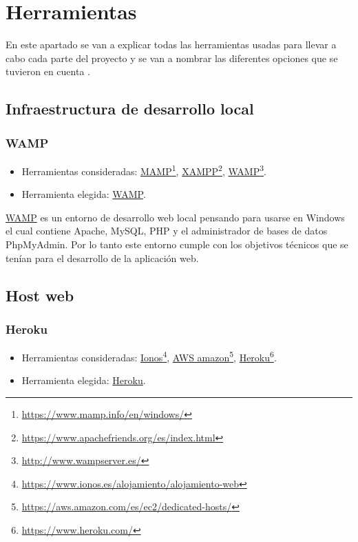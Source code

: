 \section{Herramientas} 

En este apartado se van a explicar todas las herramientas usadas para llevar a cabo cada parte del proyecto y se van a nombrar las diferentes opciones que se tuvieron en cuenta .

\subsection{Infraestructura de desarrollo local}

\subsubsection{WAMP} \label{WAMP}
\begin{itemize}
    \item Herramientas consideradas: \href{https://www.mamp.info/en/windows/}{MAMP}\footnote{\href{https://www.mamp.info/en/windows/}{https://www.mamp.info/en/windows/}}, \href{https://www.apachefriends.org/es/index.html}{XAMPP}\footnote{\href{https://www.apachefriends.org/es/index.html}{https://www.apachefriends.org/es/index.html}}, \href{http://www.wampserver.es/}{WAMP}\footnote{\label{wampfoot}\href{http://www.wampserver.es/}{http://www.wampserver.es/}}.
	\item Herramienta elegida: \href{http://www.wampserver.es/}{WAMP}.
\end{itemize}

\href{http://www.wampserver.es/}{WAMP} es un entorno de desarrollo web local pensando para usarse en Windows el cual contiene Apache, MySQL, PHP y el administrador de bases de datos PhpMyAdmin. Por lo tanto este entorno cumple con los objetivos técnicos que se tenían para el desarrollo de la aplicación web.

\subsection{Host web}

\subsubsection{Heroku} \label{Heroku}
\begin{itemize}
    \item Herramientas consideradas: \href{https://www.ionos.es/alojamiento/alojamiento-web}{Ionos}\footnote{\href{https://www.ionos.es/alojamiento/alojamiento-web}{https://www.ionos.es/alojamiento/alojamiento-web}}, \href{https://aws.amazon.com/es/ec2/dedicated-hosts/}{AWS amazon}\footnote{\href{https://aws.amazon.com/es/ec2/dedicated-hosts/}{https://aws.amazon.com/es/ec2/dedicated-hosts/}}, \href{https://www.heroku.com/}{Heroku}\footnote{\label{herokufoot}\href{https://www.heroku.com/}{https://www.heroku.com/}}.
    \item Herramienta elegida: \href{https://www.heroku.com/}{Heroku}.
\end{itemize}

